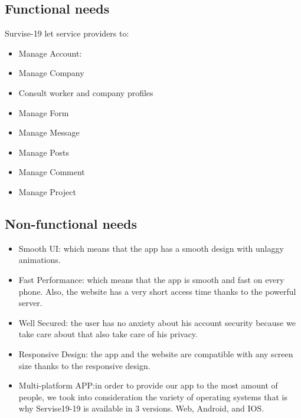 \documentclass[12pt]{report}
\begin{document}
\subsection{Functional needs}
Survise-19 let service providers to:
\begin{itemize}
 \item Manage Account:
 \item Manage Company
 \item Consult worker and company profiles
   \pagebreak
  \item Manage Form
  \item Manage Message
  \item Manage Posts
  \item Manage Comment
  \item Manage Project
   
  
   


\end{itemize}
\subsection{Non-functional needs}
\begin{itemize}
  \item Smooth UI: which means that the app has a smooth design with unlaggy animations.
  \item Fast Performance: which means that the app is smooth and fast on every phone. Also, the website has a very short access time thanks to the powerful server.
  \item Well Secured: the user has no anxiety about his account security because we take care about that also take care of his privacy.
  \item Responsive Design: the app and the website are compatible with any screen size thanks to the responsive design.
  \item Multi-platform APP:in order to provide our app to the most amount of people, we took into consideration the variety of operating systems that is why Servise19-19 is available in 3 versions. Web, Android, and IOS.


\setcounter{secnumdepth}{3}
\end{itemize}
\end{document}
